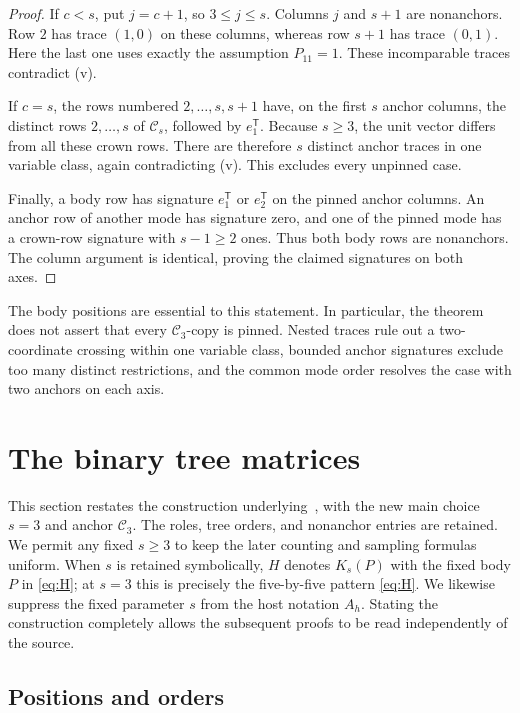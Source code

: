 \documentclass[11pt]{article}
\theoremstyle{definition}
\newcommand{\crown}{\mathcal C}
\begin{document}
\begin{proof}
If \(c<s\), put \(j=c+1\), so \(3\le j\le s\). Columns \(j\)
and \(s+1\) are nonanchors. Row \(2\) has trace \((1,0)\) on
these columns, whereas row \(s+1\) has trace \((0,1)\). Here the
last one uses exactly the assumption \(P_{11}=1\). These incomparable
traces contradict (v).

If \(c=s\), the rows numbered \(2,\ldots,s,s+1\) have, on the
first \(s\) anchor columns, the distinct rows \(2,\ldots,s\) of
\(\crown_s\), followed by \(e_1^{\mathsf T}\). Because \(s\ge3\),
the unit vector differs from all these crown rows. There are therefore
\(s\) distinct anchor traces in one variable class, again contradicting
(v). This excludes every unpinned case.

Finally, a body row has signature \(e_1^{\mathsf T}\) or
\(e_2^{\mathsf T}\) on the pinned anchor columns. An anchor row
of another mode has signature zero, and one of the pinned mode has
a crown-row signature with \(s-1\ge2\) ones. Thus both body rows
are nonanchors. The column argument is identical, proving the claimed
signatures on both axes.
\end{proof}

The body positions are essential to this statement. In particular,
the theorem does not assert that every \(\crown_3\)-copy is pinned.
Nested traces rule out a two-coordinate crossing within one variable
class, bounded anchor signatures exclude too many distinct restrictions,
and the common mode order resolves the case with two anchors on each axis.

\section{The binary tree matrices}
\label{sec:construction}

This section restates the construction underlying~\cite{OAI190}, with
the new main choice \(s=3\) and anchor \(\crown_3\). The roles, tree
orders, and nonanchor entries are retained. We permit any fixed
\(s\ge3\) to keep the later counting and sampling formulas uniform.
When \(s\) is retained symbolically, \(H\) denotes \(K_s(P)\) with
the fixed body \(P\) in \eqref{eq:H}; at \(s=3\) this is precisely
the five-by-five pattern \eqref{eq:H}. We likewise suppress the fixed
parameter \(s\) from the host notation \(A_h\). Stating the construction
completely allows the subsequent proofs to be read independently of the source.

\subsection{Positions and orders}
\end{document}
